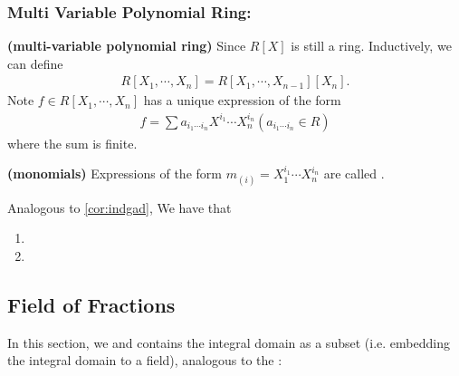 \documentclass{article}
\newcommand{\bfs}[1]{\textbf{({#1}) }}
\begin{document}
\subsubsection{Multi Variable Polynomial Ring: }
\begin{defa}\bfs{multi-variable polynomial ring}
 Since $R[X]$ is still a ring. Inductively, we can define
\begin{align*}
R\left[X_{1}, \cdots, X_{n}\right]=R\left[X_{1}, \cdots, X_{n-1}\right]\left[X_{n}\right].
\end{align*}
Note $f \in R\left[X_{1}, \cdots, X_{n}\right]$ has a unique expression of the form
\begin{align*}
f=\sum a_{i_{1} \cdots i_{n}} X^{i_{1}} \cdots X_{n}^{i_{n}}\left(a_{i_{1} \cdots i_{n}} \in R\right)
\end{align*}
where the sum is finite.
\end{defa}
\begin{defa}\bfs{monomials}
 Expressions of the form $m_{(i)}=X_{1}^{i_{1}} \cdots X_{n}^{i_{n}}$ are called .
\end{defa}
\begin{cora}\label{cor:ncnkd}Analogous to \cref{cor:indgad}, We have that
\begin{enumerate}
    \item {}
    \item {}
\end{enumerate}
\end{cora}
\subsection{Field of Fractions}
In this section, we  and contains the integral domain as a subset (i.e. embedding the integral domain to a field), analogous to the :
\end{document}
